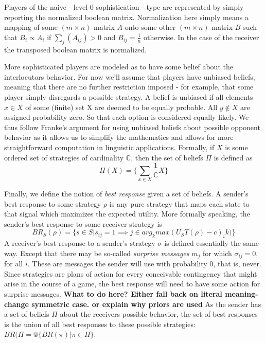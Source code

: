 \documentclass[10]{article}
\begin{document}
Players of the naive - level-0 sophistication - type are represented by simply reporting the normalized boolean matrix. Normalization here simply means a mapping of some $(m\times n)$-matrix $A$ onto some other $(m\times n)$-matrix $B$ such that $B_i\propto A_i$ if $\sum_j (A_{ij})>0$ and $B_{ij}=\tfrac{1}{n}$ otherwise. In the case of the receiver the transposed boolean matrix is normalized.

More sophisticated players are modeled as to have some belief about the interlocutors behavior. For now we'll assume that players have unbiased beliefs, meaning that there are no further restriction imposed - for example, that some player simply disregards a possible strategy. A belief is unbiased if all elements $x\in X$ of some (finite) set X are deemed to be equally probable. All $y\not\in X$ are assigned probability zero. So that each option is considered equally likely. We thus follow Franke's argument for %
 using unbiased beliefs about possible opponent behavior as it allows us to simplify the mathematics and allows for more straightforward computation in linguistic applications. Formally, if $X$ is some ordered set of strategies of cardinality $\mathbb{C}$, then the set of beliefs $\Pi$ is defined as\\
\begin{equation*}
\Pi(X)=\{\sum_{x\in X} \dfrac{1}{\mathbb{C}}X\}
\end{equation*} %

Finally, we define the notion of \textit{best response} given a set of beliefs. A sender's best response to some strategy $\rho$ is any pure strategy that maps each state to that signal which maximizes the expected utility. 
More formally speaking, the sender's best response to some receiver strategy is\\
\begin{equation*}
BR_S(\rho)=\{s\in S | s_{ij}=1\implies j \in arg_kmax(U_S T(\rho)-c)_ik)\}
\end{equation*} 
A receiver's best response to a sender's strategy $\sigma$ is defined essentially the same way. Except that there may be so-called \textit{surprise messages} $m_j$ for which $\sigma_{ij}=0$, for all $i$. These are messages the sender will use with probability 0, that is, never. Since strategies are plans of action for every conceivable contingency that might arise in the course of a game, the best response will need to have some action for surprise messages.
\textbf{What to do here? Either fall back on literal meaning-change symmetric case. or explain why priors are used}
As the sender has a set of beliefs $\Pi$ about the receivers possible behavior, the set of best responses is the union of all best responses to these possible strategies: $BR(\Pi=\Cup\{BR(\pi)|\pi\in\Pi\}$.
\end{document}
